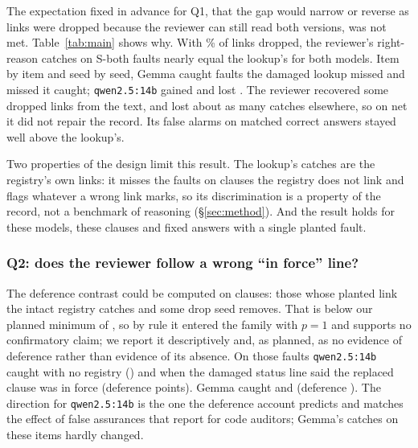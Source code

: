 The expectation fixed in advance for Q1, that the gap would narrow or reverse as links were dropped because the reviewer
can still read both versions, was not met. Table~\ref{tab:main} shows why. With \DamageDropFifty\% of links
dropped, the reviewer's right-reason catches on S-both faults nearly equal the lookup's for both models. Item by item
and seed by seed, Gemma caught \RecGainedDropFiftyGemma{} faults the damaged lookup missed and missed
\RecLostDropFiftyGemma{} it caught; \texttt{qwen2.5:14b} gained \RecGainedDropFiftyQwenFourteen{} and lost
\RecLostDropFiftyQwenFourteen. The reviewer recovered some dropped links from the text, and lost about as many
catches elsewhere, so on net it did not repair the record. Its false alarms on matched correct answers stayed well
above the lookup's.

Two properties of the design limit this result. The lookup's catches are the registry's own links: it misses
the faults on clauses the registry does not link and flags whatever a wrong link marks, so its discrimination is a
property of the record, not a benchmark of reasoning (\S\ref{sec:method}). And the result holds for these models,
these \NClauses{} clauses and fixed answers with a single planted fault.

\subsubsection{Q2: does the reviewer follow a wrong ``in force'' line?}
\label{sec:res-q2}
The deference contrast could be computed on \NDroppedClausesQwenFourteen{} clauses: those whose planted link the
intact registry catches and some drop seed removes. That is below our planned minimum of \MinClauses{}, so by
rule it entered the family with $p=1$ and supports no confirmatory claim; we report it descriptively and, as
planned, as no evidence of deference rather than evidence of its absence. On those faults
\texttt{qwen2.5:14b} caught \OwnCatchDroppedQwenFourteen{} with no registry () and
\CatchDroppedQwenFourteen{} when the damaged status line said the replaced clause was in force (deference
\DiffDeferQwenFourteen{} points). Gemma caught \OwnCatchDroppedGemma{} and \CatchDroppedGemma{} (deference
\DiffDeferGemma). The direction for \texttt{qwen2.5:14b} is the one the deference account predicts and matches the
effect of false assurances that \citet{liu2026trusting} report for code auditors; Gemma's catches on these items
hardly changed.

